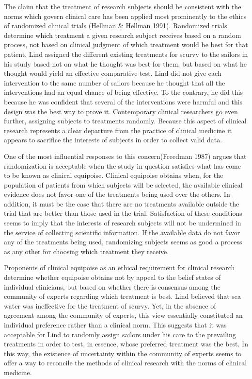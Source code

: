 \documentclass[12p]{article}
\begin{document}
The claim that the treatment of research subjects should be consistent with the norms which govern clinical care has been applied most prominently to the ethics of randomized clinical trials (Hellman & Hellman 1991). Randomized trials determine which treatment a given research subject receives based on a random process, not based on clinical judgment of which treatment would be best for that patient. Lind assigned the different existing treatments for scurvy to the sailors in his study based not on what he thought was best for them, but based on what he thought would yield an effective comparative test. Lind did not give each intervention to the same number of sailors because he thought that all the interventions had an equal chance of being effective. To the contrary, he did this because he was confident that several of the interventions were harmful and this design was the best way to prove it. Contemporary clinical researchers go even further, assigning subjects to treatments randomly. Because this aspect of clinical research represents a clear departure from the practice of clinical medicine it appears to sacrifice the interests of subjects in order to collect valid data.

One of the most influential responses to this concern(Freedman 1987) argues that randomization is acceptable when the study in question satisfies what has come to be known as clinical equipoise. Clinical equipoise obtains when, for the population of patients from which subjects will be selected, the available clinical evidence does not favor one of the treatments being used over the others. In addition, it must be the case that there are no treatments available outside the trial that are better than those used in the trial. Satisfaction of these conditions seems to imply that the interests of research subjects will not be undermined in the service of collecting scientific information. If the available data do not favor any of the treatments being used, randomizing subjects seems as good a process as any other for choosing which treatment they receive.

Proponents of clinical equipoise as an ethical requirement for clinical research determine whether equipoise obtains not by appeal to the belief states of individual clinicians, but based on whether there is consensus among the community of experts regarding which treatment is best. Lind believed that sea water was ineffective for the treatment of scurvy. Yet, in the absence of agreement among the community of experts, this view essentially constituted an individual preference rather than a clinical norm. This suggests that it was acceptable for Lind to randomly assign sailors under his care to the prevailing treatments in order to test, in essence, whose preferred treatment was the best. In this way, the existence of uncertainty within the community of experts seems to offer a way to reconcile the methods of clinical research with the norms of clinical medicine.
\end{document}
